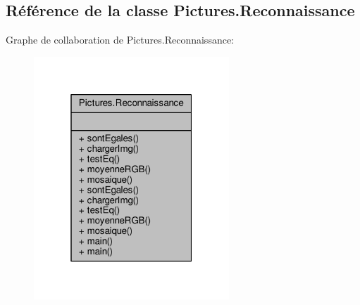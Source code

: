 \hypertarget{classPictures_1_1Reconnaissance}{}\subsection{Référence de la classe Pictures.\+Reconnaissance}
\label{classPictures_1_1Reconnaissance}


Graphe de collaboration de Pictures.\+Reconnaissance\+:\nopagebreak
\begin{figure}[H]
\begin{center}
\leavevmode
\includegraphics[width=208pt]{classPictures_1_1Reconnaissance__coll__graph}
\end{center}
\end{figure}
